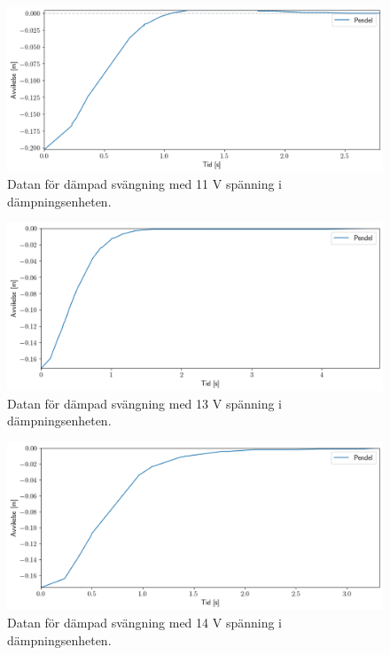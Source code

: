 \documentclass[12pt, a4paper]{article}
\begin{document}
\begin{figure}[hp]
	\includegraphics[width=\textwidth]{graf_11_v_centered}
	\caption{Datan för dämpad svängning med 11 V spänning i dämpningsenheten.}
	\label{fig:data_11_v}
\end{figure}

\begin{figure}[hp]
	\includegraphics[width=\textwidth]{graf_13_v_centered}
	\caption{Datan för dämpad svängning med 13 V spänning i dämpningsenheten.}
	\label{fig:data_13_v}
\end{figure}

\begin{figure}[hp]
	\includegraphics[width=\textwidth]{graf_14_v_centered}
	\caption{Datan för dämpad svängning med 14 V spänning i dämpningsenheten.}
	\label{fig:data_14_v}
\end{figure}
\end{document}
